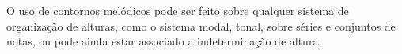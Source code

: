 \documentclass[brazil]{article}
\begin{document}
O uso de contornos melódicos pode ser feito sobre qualquer sistema de
organização de alturas, como o sistema modal, tonal, sobre séries e
conjuntos de notas, ou pode ainda estar associado a indeterminação de
altura.

\renewcommand{\refname}{Referências Bibliográficas}


\end{document}
